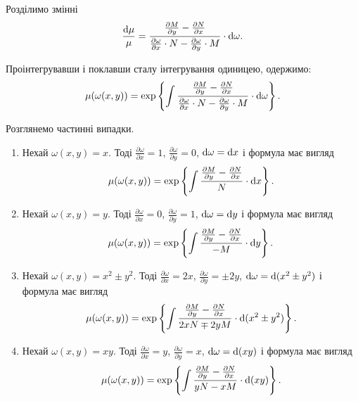 Розділимо змінні
\begin{equation*}
	\frac{\mathop{}\!\mathrm{d} \mu}{\mu} = \frac{\frac{\partial M}{\partial y} - \frac{\partial N}{\partial x} }{\frac{\partial \omega}{\partial x} \cdot N - \frac{\partial \omega}{\partial y} \cdot M} \cdot \mathop{}\!\mathrm{d} \omega.
\end{equation*}

Проінтегрувавши і поклавши сталу інтегрування одиницею, одержимо:
\begin{equation*}
	\mu(\omega(x,y)) = \exp\left\{\int \frac{\frac{\partial M}{\partial y} - \frac{\partial N}{\partial x} }{\frac{\partial \omega}{\partial x} \cdot N - \frac{\partial \omega}{\partial y} \cdot M} \cdot \mathop{}\!\mathrm{d} \omega\right\}.
\end{equation*}

Розглянемо частинні випадки.
\begin{enumerate}
	\item Нехай $\omega(x, y) = x$. Тоді $\frac{\partial \omega}{\partial x} = 1$, $\frac{\partial \omega}{\partial y} = 0$, $\mathop{}\!\mathrm{d} \omega = \mathop{}\!\mathrm{d} x$ і формула має вигляд
	\begin{equation*}
		\mu(\omega(x,y)) = \exp\left\{\int \frac{\frac{\partial M}{\partial y} - \frac{\partial N}{\partial x} }{N} \cdot \mathop{}\!\mathrm{d} x\right\}.
	\end{equation*}	

	\item Нехай $\omega(x, y) = y$. Тоді $\frac{\partial \omega}{\partial x} = 0$, $\frac{\partial \omega}{\partial y} = 1$, $\mathop{}\!\mathrm{d} \omega = \mathop{}\!\mathrm{d} y$ і формула має вигляд
	\begin{equation*}
		\mu(\omega(x,y)) = \exp\left\{\int \frac{\frac{\partial M}{\partial y} - \frac{\partial N}{\partial x} }{-M} \cdot \mathop{}\!\mathrm{d} y\right\}.
	\end{equation*}

	\item Нехай $\omega(x, y) = x^2 \pm y^2$. Тоді $\frac{\partial \omega}{\partial x} = 2 x$, $\frac{\partial \omega}{\partial y} = \pm 2y$, $\mathop{}\!\mathrm{d} \omega = \mathop{}\!\mathrm{d} (x^2 \pm y^2)$ і формула має вигляд
	\begin{equation*}
		\mu(\omega(x,y)) = \exp\left\{\int \frac{\frac{\partial M}{\partial y} - \frac{\partial N}{\partial x} }{2 x N \mp 2 y M} \cdot \mathop{}\!\mathrm{d} (x^2 \pm y^2)\right\}.
	\end{equation*}

	\item Нехай $\omega(x, y) = x y$. Тоді $\frac{\partial \omega}{\partial x} = y$, $\frac{\partial \omega}{\partial y} = x$, $\mathop{}\!\mathrm{d} \omega = \mathop{}\!\mathrm{d} (xy)$ і формула має вигляд
	\begin{equation*}
		\mu(\omega(x,y)) = \exp\left\{\int \frac{\frac{\partial M}{\partial y} - \frac{\partial N}{\partial x} }{yN-xM} \cdot \mathop{}\!\mathrm{d} (xy)\right\}.
	\end{equation*}
\end{enumerate}
